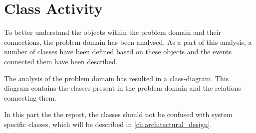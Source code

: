 \section{Class Activity} \label{sc:classes}
To better understand the objects within the problem domain and their connections, the problem domain has been analysed. As a part of this analysis, a number of classes have been defined based on these objects and the events connected them have been described.
\par

The analysis of the problem domain has resulted in a class-diagram. This diagram contains the classes present in the problem domain and the relations connecting them.
\par



In this part the the report, the classes should not be confused with system specific classes, which will be described in \autoref{ch:architectural_design}.
